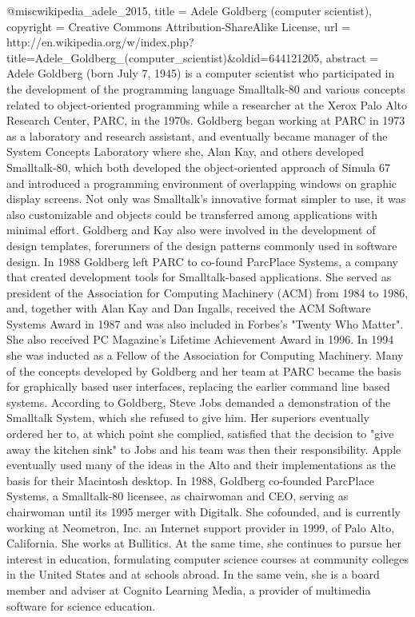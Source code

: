 {@misc{wikipedia_adele_2015,
	title = {Adele {Goldberg} (computer scientist)},
	copyright = {Creative Commons Attribution-ShareAlike License},
	url = {http://en.wikipedia.org/w/index.php?title=Adele_Goldberg_(computer_scientist)&oldid=644121205},
	abstract = {Adele Goldberg (born July 7, 1945) is a computer scientist who participated in the development of the programming language Smalltalk-80 and various concepts related to object-oriented programming while a researcher at the Xerox Palo Alto Research Center, PARC, in the 1970s.
Goldberg began working at PARC in 1973 as a laboratory and research assistant, and eventually became manager of the System Concepts Laboratory where she, Alan Kay, and others developed Smalltalk-80, which both developed the object-oriented approach of Simula 67 and introduced a programming environment of overlapping windows on graphic display screens. Not only was Smalltalk's innovative format simpler to use, it was also customizable and objects could be transferred among applications with minimal effort. Goldberg and Kay also were involved in the development of design templates, forerunners of the design patterns commonly used in software design. In 1988 Goldberg left PARC to co-found ParcPlace Systems, a company that created development tools for Smalltalk-based applications.
She served as president of the Association for Computing Machinery (ACM) from 1984 to 1986, and, together with Alan Kay and Dan Ingalls, received the ACM Software Systems Award in 1987 and was also included in Forbes's "Twenty Who Matter". She also received PC Magazine's Lifetime Achievement Award in 1996. In 1994 she was inducted as a Fellow of the Association for Computing Machinery.
Many of the concepts developed by Goldberg and her team at PARC became the basis for graphically based user interfaces, replacing the earlier command line based systems. According to Goldberg, Steve Jobs demanded a demonstration of the Smalltalk System, which she refused to give him. Her superiors eventually ordered her to, at which point she complied, satisfied that the decision to "give away the kitchen sink" to Jobs and his team was then their responsibility. Apple eventually used many of the ideas in the Alto and their implementations as the basis for their Macintosh desktop.
In 1988, Goldberg co-founded ParcPlace Systems, a Smalltalk-80 licensee, as chairwoman and CEO, serving as chairwoman until its 1995 merger with Digitalk.
She cofounded, and is currently working at Neometron, Inc. an Internet support provider in 1999, of Palo Alto, California. She works at Bullitics. At the same time, she continues to pursue her interest in education, formulating computer science courses at community colleges in the United States and at schools abroad. In the same vein, she is a board member and adviser at Cognito Learning Media, a provider of multimedia software for science education.
}}}
